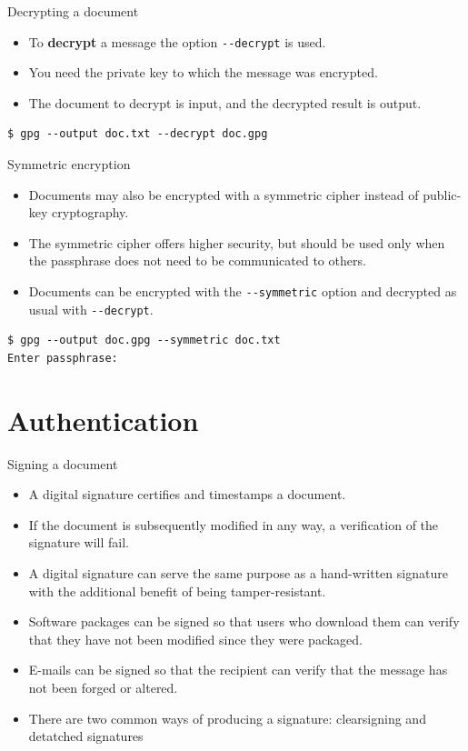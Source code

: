 \documentclass[
mode=present,
paper=smartboard,
size=20pt,
]{powerdot}
\newcommand{\clopt}[1]{\texttt{{-}#1}}
\begin{document}
\begin{slide}[method=direct]{Decrypting a document}
  \begin{itemize}
  \item To \textbf{decrypt} a message the option \clopt{-decrypt} is used.
  \item You need the private key to which the message was encrypted.
  \item The document to decrypt is input, and the decrypted result is
    output.
  \end{itemize}
\begin{verbatim}
$ gpg --output doc.txt --decrypt doc.gpg
\end{verbatim}
\end{slide}

\begin{slide}[method=direct]{Symmetric encryption}
  \begin{itemize}
  \item Documents may also be encrypted with a symmetric cipher
    instead of public-key cryptography.
  \item The symmetric cipher offers higher security, but should be
    used only when the passphrase does not need to be communicated to
    others.
  \item Documents can be encrypted with the \clopt{-symmetric} option
    and decrypted as usual with \clopt{-decrypt}.
  \end{itemize}
\begin{verbatim}
$ gpg --output doc.gpg --symmetric doc.txt
Enter passphrase:
\end{verbatim}
\end{slide}

\section{Authentication}

\begin{slide}{Signing a document}
  \begin{itemize}
  \item A digital signature certifies and timestamps a document.
  \item If the document is subsequently modified in any way, a
    verification of the signature will fail.
  \item A digital signature can serve the same purpose as a
    hand-written signature with the additional benefit of being
    tamper-resistant.
  \item Software packages can be signed so that users who download
    them can verify that they have not been modified since they were
    packaged.
  \item E-mails can be signed so that the recipient can verify that the
    message has not been forged or altered.
  \item There are two common ways of producing a signature:
    clearsigning and detatched signatures
  \end{itemize}
\end{slide}
\end{document}
